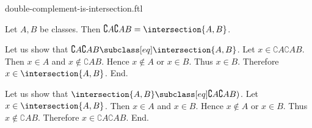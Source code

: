 \documentclass{article}
\begin{document}
\begin{smodule}[creators={Marcel Schütz}]{double-complement-is-intersection.ftl}

  \begin{fproposition*}[label=554506062397440]
    Let $A, B$ be classes.
    Then $\complement{A}{\complement{A}{B}} = \intersection{A,B}$.
  \end{fproposition*}
  \begin{fproof}
    Let us show that $\complement{A}{\complement{A}{B}} \subclass[eq] \intersection{A,B}$.
      Let $x \in \complement{A}{\complement{A}{B}}$.
      Then $x \in A$ and $x \notin \complement{A}{B}$.
      Hence $x \notin A$ or $x \in B$.
      Thus $x \in B$.
      Therefore $x \in \intersection{A,B}$.
    End.

    Let us show that $\intersection{A,B} \subclass[eq] \complement{A}{\complement{A}{B}})$.
      Let $x \in \intersection{A,B}$.
      Then $x \in A$ and $x \in B$.
      Hence $x \notin A$ or $x \in B$.
      Thus $x \notin \complement{A}{B}$.
      Therefore $x \in \complement{A}{\complement{A}{B}}$.
    End.
  \end{fproof}
\end{smodule}
\end{document}

